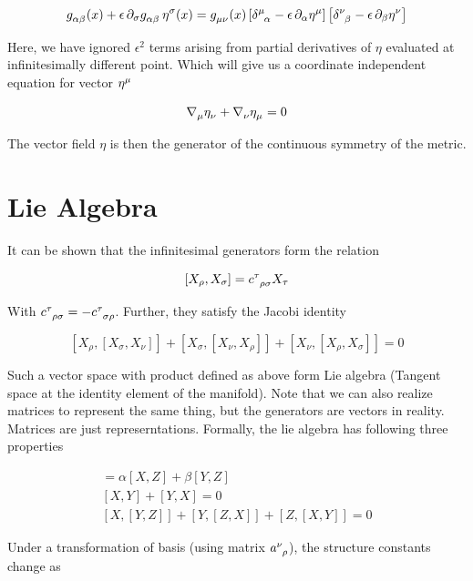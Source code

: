 \documentclass{report}
\begin{document}
$$g\indices{_\alpha_ \beta}(x) + \epsilon \, \partial_\sigma g\indices{_\alpha_ \beta} \, \eta\indices{^\sigma}(x)= g\indices{_\mu_ \nu}(x) \left[\delta\indices{^\mu_\alpha} -\epsilon \, \partial_\alpha\eta\indices{^\mu}\right] \left[\delta\indices{^\nu_ \beta} -\epsilon \, \partial_ \beta\eta\indices{^\nu}\right]  $$

\noindent Here, we have ignored $\epsilon^2$ terms arising from partial derivatives of $\eta$ evaluated at infinitesimally different point. Which will give us a coordinate independent equation for vector $\eta\indices{^\mu}$

\begin{equation}
\nabla\indices{_\mu}\eta\indices{_\nu} + \nabla\indices{_\nu}\eta\indices{_\mu} = 0 
\end{equation}

\noindent The vector field $\eta$ is then the generator of the continuous symmetry of the metric.

\section{Lie Algebra}

It can be shown that the infinitesimal generators form the relation

$$[X_ \rho, X_\sigma] = c\indices{^{\tau}_ \rho_\sigma}X_\tau$$

\noindent With $c\indices{^\tau_ \rho_\sigma} = -c\indices{^\tau_ \sigma_ \rho}$. Further, they satisfy the Jacobi identity

$$[X_ \rho,[X_\sigma,X_\nu]]+ [X_ \sigma,[X_\nu,X_ \rho]] + [X_ \nu,[X_ \rho,X_\sigma]] = 0 $$

\noindent Such a vector space with product defined as above form Lie algebra (Tangent space at the identity element of the manifold). Note that we can also realize matrices to represent the same thing, but the generators are vectors in reality. Matrices are just represerntations. Formally, the lie algebra has following three properties

\begin{gather}
  [\alpha X + \beta Y, Z] = \alpha[X,Z]+\beta[Y,Z]\\
  [X,Y]+[Y,X] = 0\\
  [X,[Y,Z]]+[Y,[Z,X]]+[Z,[X,Y]] = 0
\end{gather}

\noindent Under a transformation of basis (using matrix $a\indices{^\nu_ \rho}$), the structure constants change as 
\end{document}
